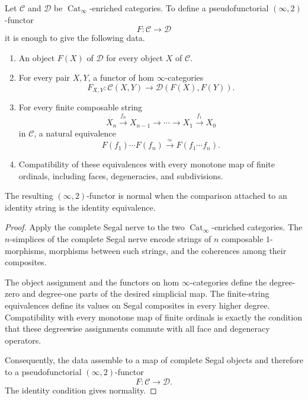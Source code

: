 \begin{lemma}
\label{lem:enriched-correspondence-extension}
Let \(\mathcal C\) and \(\mathcal D\) be
\(\operatorname{Cat}_\infty\)-enriched categories.  To define a
pseudofunctorial \((\infty,2)\)-functor
\[
    F:\mathcal C\longrightarrow\mathcal D
\]
it is enough to give the following data.

\begin{enumerate}
    \item An object \(F(X)\) of \(\mathcal D\) for every object \(X\) of
    \(\mathcal C\).

    \item For every pair \(X,Y\), a functor of hom \(\infty\)-categories
    \[
        F_{X,Y}:
        \mathcal C(X,Y)
        \longrightarrow
        \mathcal D(F(X),F(Y)).
    \]

    \item For every finite composable string
    \[
        X_n\xrightarrow{f_n}X_{n-1}
        \longrightarrow\cdots\longrightarrow
        X_1\xrightarrow{f_1}X_0
    \]
    in \(\mathcal C\), a natural equivalence
    \[
        F(f_1)\cdots F(f_n)
        \xrightarrow{\simeq}
        F(f_1\cdots f_n).
    \]

    \item Compatibility of these equivalences with every monotone map of
    finite ordinals, including faces, degeneracies, and subdivisions.
\end{enumerate}

The resulting \((\infty,2)\)-functor is normal when the comparison attached
to an identity string is the identity equivalence.
\end{lemma}

\begin{proof}
Apply the complete Segal nerve to the two
\(\operatorname{Cat}_\infty\)-enriched categories.  The \(n\)-simplices of
the complete Segal nerve encode strings of \(n\) composable
\(1\)-morphisms, morphisms between such strings, and the coherences among
their composites.

The object assignment and the functors on hom \(\infty\)-categories define
the degree-zero and degree-one parts of the desired simplicial map.  The
finite-string equivalences define its values on Segal composites in every
higher degree.  Compatibility with every monotone map of finite ordinals is
exactly the condition that these degreewise assignments commute with all
face and degeneracy operators.

Consequently, the data assemble to a map of complete Segal objects and
therefore to a pseudofunctorial \((\infty,2)\)-functor
\[
    F:\mathcal C\longrightarrow\mathcal D.
\]
The identity condition gives normality.
\end{proof}

